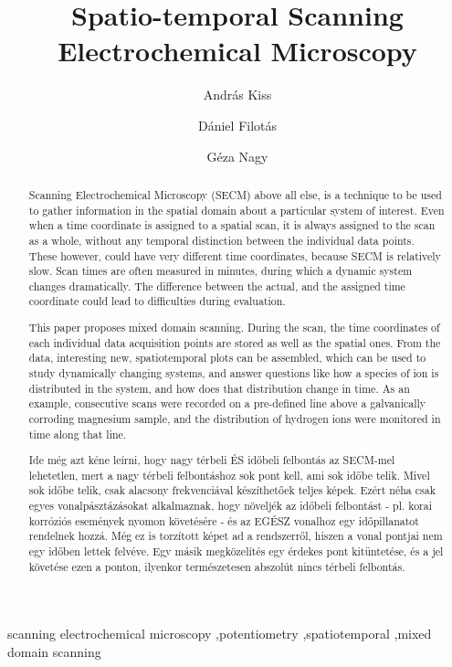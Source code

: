 \documentclass[3p]{elsarticle}
\begin{document}
\begin{frontmatter}

\title{Spatio-temporal Scanning Electrochemical Microscopy}
\author[akiss]{András Kiss}
\address[akiss, gnagy]{Department of General and Physical Chemistry, Faculty of Sciences, University of Pécs, 7624 Pécs, Ifjúság útja 6, Hungary}
\author[dfilotas]{Dániel Filotás}
\author[gnagy]{Géza Nagy}


\begin{abstract}

Scanning Electrochemical Microscopy (SECM) above all else, is a technique to be used to gather information in the spatial domain about a particular system of interest.
Even when a time coordinate is assigned to a spatial scan, it is always assigned to the scan as a whole, without any temporal distinction between the individual data points.
These however, could have very different time coordinates, because SECM is relatively slow.
Scan times are often measured in minutes, during which a dynamic system changes dramatically.
The difference between the actual, and the assigned time coordinate could lead to difficulties during evaluation.
 
This paper proposes mixed domain scanning.
During the scan, the time coordinates of each individual data acquisition points are stored as well as the spatial ones.
From the data, interesting new, spatiotemporal plots can be assembled, which can be used to study dynamically changing systems, and answer questions like how a species of ion is distributed in the system, and how does that distribution change in time.
As an example, consecutive scans were recorded on a pre-defined line above a galvanically corroding magnesium sample, and the distribution of hydrogen ions were monitored in time along that line.

Ide még azt kéne leírni, hogy nagy térbeli ÉS időbeli felbontás az SECM-mel lehetetlen, mert a nagy térbeli felbontáshoz sok pont kell, ami sok időbe telik.
Mivel sok időbe telik, csak alacsony frekvenciával készíthetőek teljes képek.
Ezért néha csak egyes vonalpásztázásokat alkalmaznak, hogy növeljék az időbeli felbontást - pl. korai korróziós események nyomon követésére - és az EGÉSZ vonalhoz egy időpillanatot rendelnek hozzá.
Még ez is torzított képet ad a rendszerről, hiszen a vonal pontjai nem egy időben lettek felvéve.
Egy másik megközelítés egy érdekes pont kitüntetése, és a jel követése ezen a ponton, ilyenkor természetesen abszolút nincs térbeli felbontás.


\end{abstract}
\begin{keyword}
	scanning electrochemical microscopy \sep potentiometry \sep spatiotemporal \sep mixed domain scanning
\end{keyword}
\end{frontmatter}
\end{document}
